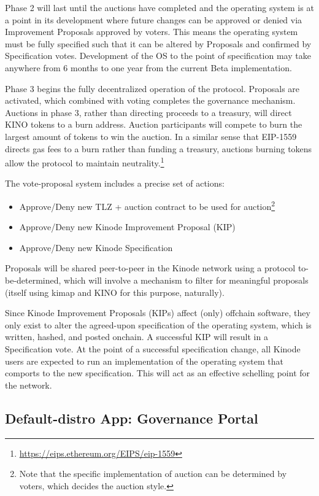 \documentclass[runningheads]{llncs}
\begin{document}
Phase 2 will last until the auctions have completed and the operating system is at a point in its development where future changes can be approved or denied via Improvement Proposals approved by voters.
This means the operating system must be fully specified such that it can be altered by Proposals and confirmed by Specification votes.
Development of the OS to the point of specification may take anywhere from 6 months to one year from the current Beta implementation.

Phase 3 begins the fully decentralized operation of the protocol.
Proposals are activated, which combined with voting completes the governance mechanism.
Auctions in phase 3, rather than directing proceeds to a treasury, will direct KINO tokens to a burn address.
Auction participants will compete to burn the largest amount of tokens to win the auction.
In a similar sense that EIP-1559 directs gas fees to a burn rather than funding a treasury, auctions burning tokens allow the protocol to maintain neutrality.\footnote{\url{https://eips.ethereum.org/EIPS/eip-1559}}

The vote-proposal system includes a precise set of actions:
\begin{itemize}
    \item Approve/Deny new TLZ + auction contract to be used for auction\footnote{Note that the specific implementation of auction can be determined by voters, which decides the auction style.}
    \item Approve/Deny new Kinode Improvement Proposal (KIP)
    \item Approve/Deny new Kinode Specification
\end{itemize}

Proposals will be shared peer-to-peer in the Kinode network using a protocol to-be-determined, which will involve a mechanism to filter for meaningful proposals (itself using kimap and KINO for this purpose, naturally).

Since Kinode Improvement Proposals (KIPs) affect (only) offchain software, they only exist to alter the agreed-upon specification of the operating system, which is written, hashed, and posted onchain.
A successful KIP will result in a Specification vote.
At the point of a successful specification change, all Kinode users are expected to run an implementation of the operating system that comports to the new specification.
This will act as an effective schelling point for the network.

\subsection{Default-distro App: Governance Portal}
\label{sec:govportal}
\end{document}
